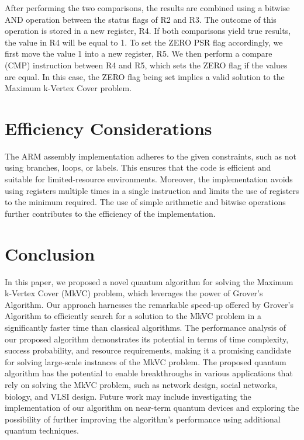 After performing the two comparisons, the results are combined using a bitwise AND operation between the status flags of R2 and R3. The outcome of this operation is stored in a new register, R4. If both comparisons yield true results, the value in R4 will be equal to 1. To set the ZERO PSR flag accordingly, we first move the value 1 into a new register, R5. We then perform a compare (CMP) instruction between R4 and R5, which sets the ZERO flag if the values are equal. In this case, the ZERO flag being set implies a valid solution to the Maximum k-Vertex Cover problem.

\section{Efficiency Considerations}

The ARM assembly implementation adheres to the given constraints, such as not using branches, loops, or labels. This ensures that the code is efficient and suitable for limited-resource environments. Moreover, the implementation avoids using registers multiple times in a single instruction and limits the use of registers to the minimum required. The use of simple arithmetic and bitwise operations further contributes to the efficiency of the implementation.

\section{Conclusion}\label{sec:conclusion}

In this paper, we proposed a novel quantum algorithm for solving the Maximum k-Vertex Cover (MkVC) problem, which leverages the power of Grover's Algorithm. Our approach harnesses the remarkable speed-up offered by Grover's Algorithm to efficiently search for a solution to the MkVC problem in a significantly faster time than classical algorithms. The performance analysis of our proposed algorithm demonstrates its potential in terms of time complexity, success probability, and resource requirements, making it a promising candidate for solving large-scale instances of the MkVC problem. The proposed quantum algorithm has the potential to enable breakthroughs in various applications that rely on solving the MkVC problem, such as network design, social networks, biology, and VLSI design. Future work may include investigating the implementation of our algorithm on near-term quantum devices and exploring the possibility of further improving the algorithm's performance using additional quantum techniques.

